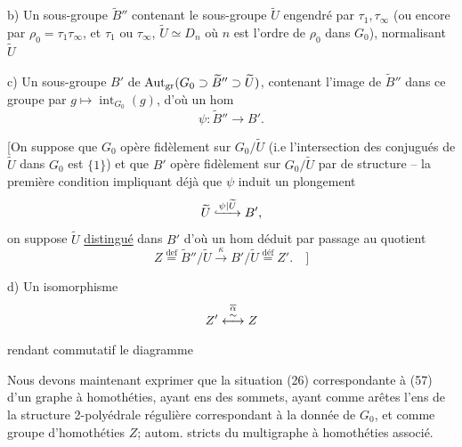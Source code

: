 b) Un sous-groupe $\widetilde B''$   contenant le sous-groupe $\widetilde U$ engendré par $\tau_1,\tau_\infty$ (ou encore par $\rho_0=\tau_1\tau_\infty$, et $\tau_1$ ou $\tau_\infty$, $\widetilde U\simeq D_n$  où $n$ est l'ordre de $\rho_0$ dans $G_0$), normalisant $\widetilde U$

c) Un sous-groupe $B'$ de $\operatorname{Aut}_{\rm gr}(G_0\supset\widetilde B''\supset\widetilde U)$,  contenant l'image de $\widetilde B''$ dans ce groupe par $g\mapsto\operatorname{int}_{G_0}(g)$, d'où un hom
\[
\psi:\widetilde B''\longrightarrow B'.
\]

[On suppose que $G_0$ opère fidèlement sur $G_0/\widetilde U$ (i.e l'intersection des conjugués de $\widetilde U$ dans $G_0$ est $\{1\}$) et que $B'$ opère fidèlement sur $G_0/\widetilde U$ par  de structure -- la première condition impliquant déjà que $\psi$ induit un plongement
\[
\widetilde U\lhook\joinrel\xrightarrow{\psi\mid\widetilde U} B',
\]
on suppose $\widetilde U$ \uline{distingué} dans $B'$  d'où un hom déduit par passage au quotient
\[
Z\overset{\mathrm{def}}{=}\widetilde B''/\widetilde U\xrightarrow{\kappa}B'/\widetilde U\overset{\mathrm{déf}}{=}Z'.\quad\biggr]
\]

d) Un isomorphisme
\[
Z'\overset{\overline{\alpha}}{\underset{\vphantom{a}}{\overset{\sim}{\longleftrightarrow}}}Z
\]
rendant commutatif le diagramme

Nous devons maintenant exprimer que  la situation (26) correspondante à (57)   d'un graphe à homothéties,  ayant    ens des sommets, ayant comme  arêtes l'ens  de la structure 2-polyédrale régulière correspondant à la donnée de $G_0$, et comme groupe d'homothéties $Z$;   autom. stricts du multigraphe à homothéties associé.

